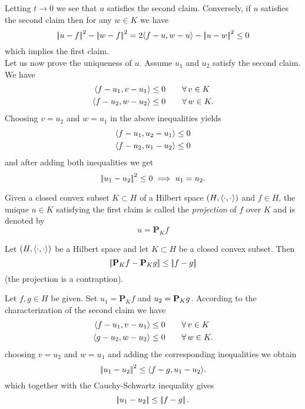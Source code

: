 \documentclass{article}
\begin{document}
\begin{fancyproof}
	Letting $t\to0$ we see that $u$ satisfies the second claim. Conversely, if $u$ satisfies the second claim then for any $w\in K$ we have
	\begin{equation*}
		\left|\negthinspace\left|u-f\right|\negthinspace\right|^{2}-\left|\negthinspace\left|w-f\right|\negthinspace\right|^{2}=2\langle f-u,w-u \rangle-\left|\negthinspace\left|u-w\right|\negthinspace\right|^{2}\leq0
	\end{equation*}
	which implies the first claim.\\
	Let us now prove the uniqueness of $u$. Assume $u_{1}$ and $u_{2}$ satisfy the second claim. We have
	\begin{align*}
		\langle f-u_{1},v-u_{1} \rangle\leq 0&\qquad\forall\, v\in K\\
		\langle f-u_{2},w-u_{2} \rangle\leq 0&\qquad\forall\, w\in K.
	\end{align*}
	Choosing $v=u_{2}$ and $w=u_{1}$ in the above inequalities yields
	\begin{align*}
		&\langle f-u_{1},u_{2}-u_{1} \rangle\leq0\\
		&\langle f-u_{2},u_{1}-u_{2} \rangle\leq0
	\end{align*}
	and after adding both inequalities we get
	\begin{equation*}
		\left|\negthinspace\left|u_{1}-u_{2}\right|\negthinspace\right|^{2}\leq 0\implies u_{1}=u_{2}.
	\end{equation*}
\end{fancyproof}
\begin{definition}
	Given a closed convex subset $K\subset H$ of a Hilbert space $\left(H,\langle \cdot,\cdot \rangle\right)$ and $f\in H$, the unique $u\in K$ satisfying the first claim is called the \textit{projection} of $f$ over $K$ and is denoted by 
	\begin{equation*}
		u=\mathbf{P}_{K}f
	\end{equation*}
\end{definition}
\begin{proposition}
	Let $\left(H,\langle \cdot,\cdot \rangle\right)$ be a Hilbert space and let $K\subset H$ be a closed convex subset. Then
	\begin{equation*}
		\left|\negthinspace\left|\mathbf{P}_{K}f-\mathbf{P}_{K}g\right|\negthinspace\right|\leq\left|\negthinspace\left|f-g\right|\negthinspace\right|
	\end{equation*}
	(the projection is a contraption).
\end{proposition}
\begin{fancyproof}
	Let $f,g\in H$ be given. Set $u_{1}=\mathbf{P}_{K}f$ and $u_{2}=\mathbf{P}_{K}g$. According to the characterization of the second claim we have
	\begin{align*}
		\langle f-u_{1},v-u_{1} \rangle\leq0&\qquad\forall\, v\in K\\
		\langle g-u_{2},w-u_{2} \rangle\leq0&\qquad\forall\, w\in K.
	\end{align*}
	choosing $v=u_{2}$ and $w=u_{1}$ and adding the corresponding inequalities we obtain
	\begin{equation*}
		\left|\negthinspace\left|u_{1}-u_{2}\right|\negthinspace\right|^{2}\leq\langle f-g,u_{1}-u_{2} \rangle. 
	\end{equation*}
	which together with the Cauchy-Schwartz inequality gives 
	\begin{equation*}
		\left|\negthinspace\left|u_{1}-u_{2}\right|\negthinspace\right|\leq\left|\negthinspace\left|f-g\right|\negthinspace\right|.
	\end{equation*}
\end{fancyproof}
\end{document}
